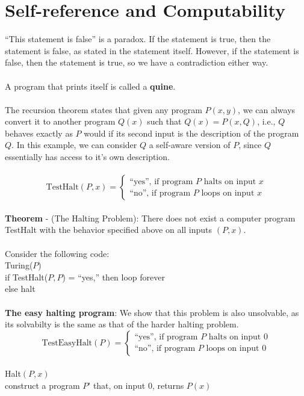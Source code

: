 \documentclass{article}
\theoremstyle{definition}
\begin{document}
\section*{Self-reference and Computability}
``This statement is false'' is a paradox. If the statement is true, then the statement is false, as stated in the statement itself. However, if the statement is false, then the statement is true, so we have a contradiction either way. \\ \\
A program that prints itself is called a \textbf{quine}. \\ \\
The recursion theorem states that given any program $P(x, y)$, we can always convert it to another program $Q(x)$ such that $Q(x) = P(x,Q)$, i.e., $Q$ behaves exactly as $P$ would if its second input is the description of the program $Q$. In this example, we can consider $Q$ a self-aware version of $P$, since $Q$ essentially has access to it's own description. \\ \\
$$\text{TestHalt}(P,x) = \begin{cases} \text{``yes'', if program } P \text{ halts on input } x \\
\text{``no'', if program } P \text{ loops on input } x
\end{cases}$$ \\
\textbf{Theorem} - (The Halting Problem): There does not exist a computer program TestHalt with the behavior specified above on all inputs $(P, x)$. \\ \\
Consider the following code: \\
Turing($P$) \\
if TestHalt($P, P$) = ``yes,'' then loop forever \\
else halt \\ \\
\textbf{The easy halting program}: We show that this problem is also unsolvable, as its solvabilty is the same as that of the harder halting problem. $$\text{TestEasyHalt}(P) = \begin{cases} \text{``yes'', if program } P \text{ halts on input } 0 \\
\text{``no'', if program } P \text{ loops on input } 0
\end{cases}$$ \\
Halt$(P, x)$ \\
construct a program $P’$ that, on input 0, returns $P(x)$ \\
\end{document}

